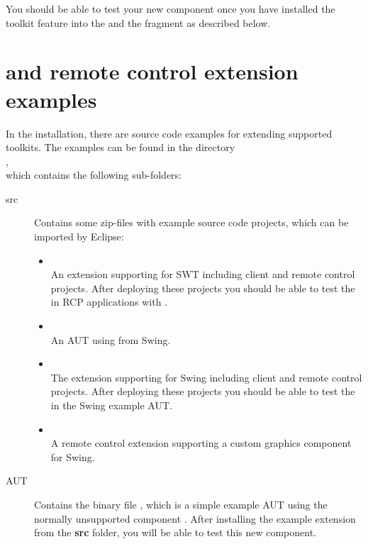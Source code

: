 You should be able to test your new component once you have installed the
toolkit feature into the \ite{} and the fragment as described below.

\section{\ite{} and remote control extension examples}
\label{extensionExamples}

In the installation, there are source code examples for extending supported toolkits. The
examples can be found in the directory\\
,\\
which contains the following sub-folders:

\begin{description}
 \item[src] Contains some zip-files with example source code projects, which
            can be imported by Eclipse:
 \begin{itemize}
   \item {}\\
         An extension supporting  for SWT including client
         and remote control projects. After deploying these projects you should
         be able to test the  in RCP applications with \app{}.
   \item {}\\
         An AUT using  from Swing.
   \item {}\\
         The  extension supporting  for Swing including
         client and remote control projects. After deploying these projects you
         should be able to test the  in the Swing example AUT.
   \item {}\\
         A remote control extension supporting a custom graphics
         component for Swing.
 \end{itemize}
 \item[AUT]  Contains the binary file , which is a simple
 example AUT using the normally unsupported component . After
 installing the  example extension from the \textbf{src}
 folder, you will be able to test this new component.
\end{description}
